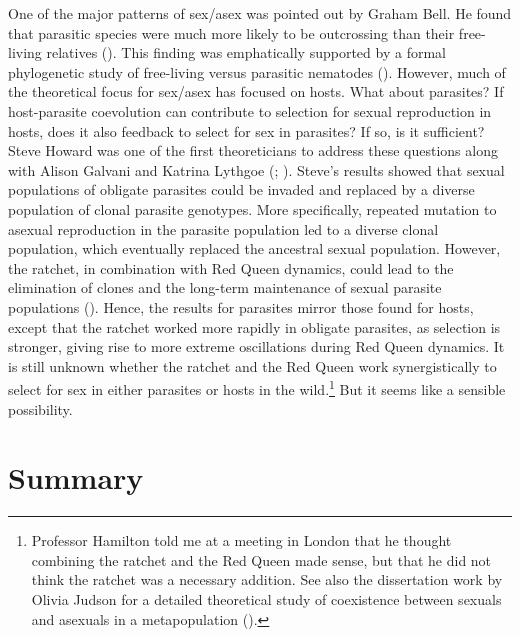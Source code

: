 \documentclass[
  american,
  letterpaper,
]{book}
\begin{document}
One of the major patterns of sex/asex was pointed out by Graham Bell. He
found that parasitic species were much more likely to be outcrossing
than their free-living relatives ().
This finding was emphatically supported by a formal phylogenetic study
of free-living versus parasitic nematodes
(). However, much of
the theoretical focus for sex/asex has focused on hosts. What about
parasites? If host-parasite coevolution can contribute to selection for
sexual reproduction in hosts, does it also feedback to select for sex in
parasites? If so, is it sufficient? Steve Howard was one of the first
theoreticians to address these questions along with Alison Galvani and
Katrina Lythgoe (; ). Steve's results
showed that sexual populations of obligate parasites could be invaded
and replaced by a diverse population of clonal parasite genotypes. More
specifically, repeated mutation to asexual reproduction in the parasite
population led to a diverse clonal population, which eventually replaced
the ancestral sexual population. However, the ratchet, in combination
with Red Queen dynamics, could lead to the elimination of clones and the
long-term maintenance of sexual parasite populations
(). Hence, the results
for parasites mirror those found for hosts, except that the ratchet
worked more rapidly in obligate parasites, as selection is stronger,
giving rise to more extreme oscillations during Red Queen dynamics. It
is still unknown whether the ratchet and the Red Queen work
synergistically to select for sex in either parasites or hosts in the
wild.\footnote{Professor Hamilton told me at a meeting in London that he
  thought combining the ratchet and the Red Queen made sense, but that
  he did not think the ratchet was a necessary addition. See also the
  dissertation work by Olivia Judson for a detailed theoretical study of
  coexistence between sexuals and asexuals in a metapopulation
  ().} But it seems like a
sensible possibility.

\section{Summary}\label{summary-4}
\end{document}
